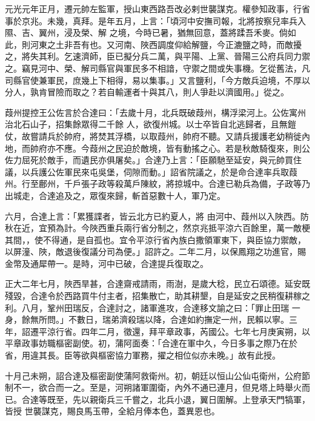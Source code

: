 \begin{pinyinscope}
 元光元年正月，遷元帥左監軍，授山東西路吾改必剌世襲謀克。權參知政事，行省事於京兆。未幾，真拜。是年五月，上言：「頃河中安撫司報，北將按察兒率兵入隰、吉、翼州，浸及榮、解
 之境，今時已暑，猶無回意，蓋將蹂吾禾麥。倘如此，則河東之土非吾有也。又河南、陜西調度仰給解鹽，今正漉鹽之時，而敵擾之，將失其利。乞速濟師，臣已擬分兵二萬，與平陽、上黨、晉陽三公府兵同力禦之。竊見河中、榮、解司縣官與軍民多不相諳，守禦之間或失事機。乞從舊法，凡司縣官使兼軍民，庶幾上下相得，易以集事。」又言鹽利，「今方敵兵迫境，不厚以分人，孰肯冒險而取之？若自輸運者十與其八，則人爭赴以濟國用。」從之。



 葭州提控王公佐言於合達曰：「去歲十月，北兵既破葭州，構浮梁河上。公佐寓州治北石山子，招集餘眾得二千餘
 人，欲復州城。以士卒皆自北逃歸者，且無鎧仗，故嘗請兵於帥府，將焚其浮橋，以取葭州，帥府不聽。又請兵援護老幼稍徙內地，而帥府亦不應。今葭州之民迫於敵境，皆有動搖之心。若是秋敵騎復來，則公佐力屈死於敵手，而遺民亦俱屠矣。」合達乃上言：「臣願馳至延安，與元帥買住議，以兵護公佐軍民來屯吳堡，伺隙而動。」詔省院議之，於是命合達率兵取葭州。行至鄜州，千戶張子政等殺萬戶陳紋，將掠城中。合達已勒兵為備，子政等乃出城走，合達追及之，眾復來歸，斬首惡數十人，軍乃定。



 六月，合達上言：「累獲諜者，皆云北方已約夏人，將
 由河中、葭州以入陜西。防秋在近，宜預為計。今陜西重兵兩行省分制之，然京兆抵平涼六百餘里，萬一敵梗其間，，使不得通，是自孤也。宜令平涼行省內族白撒領軍東下，與臣協力禦敵，以屏潼、陜，敵退後復議分司為便。」詔許之。二年二月，以保鳳翔之功進官，賜金幣及通犀帶一。是時，河中已破，合達提兵復取之。



 正大二年七月，陜西旱甚，合達齋戒請雨，雨澍，是歲大稔，民立石頌德。延安既殘毀，合達令於西路買牛付主者，招集散亡，助其耕墾，自是延安之民稍復耕稼之利。八月，鞏州田瑞反，合達討之，諸軍進攻，合達移文諭之曰：「罪止田瑞
 一身，餘無所問。」不數日，瑞弟濟殺瑞以降，合達如約撫定一州，民賴以寧。三年，詔遷平涼行省。四年二月，徵還，拜平章政事，芮國公。七年七月庚寅朔，以平章政事妨職樞密副使。初，蒲阿面奏：「合達在軍中久，今日多事之際乃在於省，用違其長。臣等欲與樞密協力軍務，擢之相位似亦未晚。」故有此授。



 十月己未朔，詔合達及樞密副使蒲阿救衛州。初，朝廷以恒山公仙屯衛州，公府節制不一，欲合而一之。至是，河朔諸軍圍衛，內外不通已連月，但見塔上時舉火而已。合達等既至，先以親衛兵三千嘗之，北兵小退，翼日圍解。上登承天門犒軍，皆授
 世襲謀克，賜良馬玉帶，全給月俸本色，蓋異恩也。




\end{pinyinscope}
